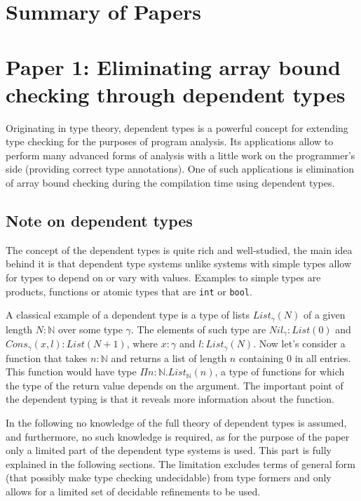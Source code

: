 \documentclass[a4paper,UKenglish]{lipics-v2016}
\begin{document}
\section{Summary of Papers}

\section{Paper 1: Eliminating array bound checking through dependent types}

\abstract

Originating in type theory, dependent types is a powerful concept for extending
type checking for the purposes of program analysis. Its applications allow to
perform many advanced forms of analysis with a little work on the programmer's
side (providing correct type annotations). One of such applications is
elimination of array bound checking during the compilation time using dependent
types.

\subsection{Note on dependent types}

The concept of the dependent types is quite rich and well-studied, the main
idea behind it is that dependent type systems unlike systems with simple types
allow for types to depend on or vary with values. Examples to simple types are
products, functions or atomic types that are \texttt{int} or \texttt{bool}.

A classical example of a dependent type is a type of lists $List_\gamma(N)$ of
a given length $N : \mathbb{N}$ over some type $\gamma$. The elements of such
type are $Nil_\gamma : List(0)$ and $Cons_\gamma(x, l) : List(N+1)$, where $x :
\gamma$ and $l : List_\gamma(N)$. Now let's consider a function that takes $n :
\mathbb{N}$ and returns a list of length $n$ containing $0$ in all entries.
This function would have type $\Pi n : \mathbb{N}.List_\mathbb{N}(n)$, a type
of functions for which the type of the return value depends on the argument.
The important point of the dependent typing is that it reveals more information
about the function.

In the following no knowledge of the full theory of dependent types is assumed,
and furthermore, no such knowledge is required, as for the purpose of the paper
only a limited part of the dependent type systems is used. This part is fully
explained in the following sections. The limitation excludes terms of general
form (that possibly make type checking undecidable) from type formers and only
allows for a limited set of decidable refinements to be used.
\end{document}
